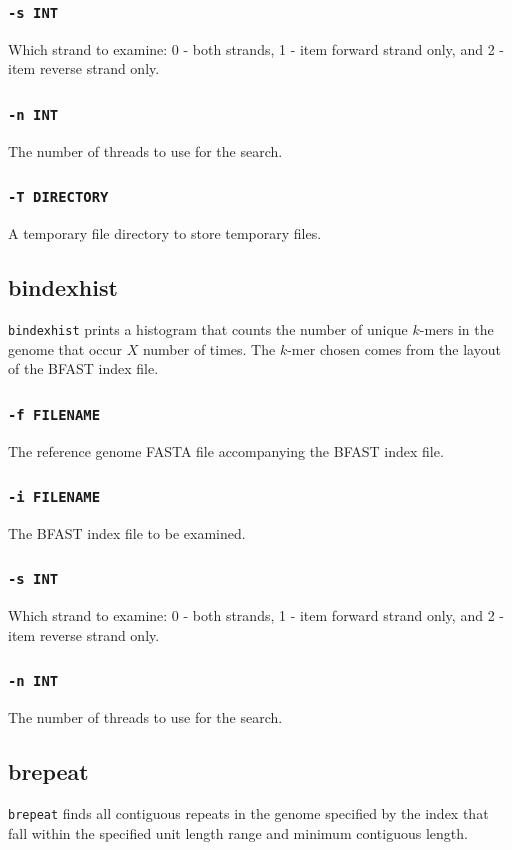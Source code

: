 \documentclass[a4paper,12pt]{book}
\newcommand{\TT}[1]{{\tt #1}} %
\newcommand{\rGFF}{reference genome FASTA file}
\newcommand{\BIF}{BFAST index file} %
\begin{document}
\subsubsection{\TT{-s INT}}
Which strand to examine: 0 - both strands, 1 - item forward strand only, and 2 - item reverse strand only.

\subsubsection{\TT{-n INT}}
The number of threads to use for the search.

\subsubsection{\TT{-T DIRECTORY}}
A temporary file directory to store temporary files.

\subsection{bindexhist}
\label{sec:bindexhist}
\TT{bindexhist} prints a histogram that counts the number of unique $k$-mers in the genome that occur $X$ number of
times.  
The $k$-mer chosen comes from the layout of the \BIF{}.

\subsubsection{\TT{-f FILENAME}}
The \rGFF{} accompanying the \BIF{}.

\subsubsection{\TT{-i FILENAME}}
The \BIF{} to be examined.

\subsubsection{\TT{-s INT}}
Which strand to examine: 0 - both strands, 1 - item forward strand only, and 2 - item reverse strand only.

\subsubsection{\TT{-n INT}}
The number of threads to use for the search.

\subsection{brepeat}
\label{sec:brepeat}
\TT{brepeat} finds all contiguous repeats in the genome specified by the index that fall within the specified unit length range and minimum contiguous length.
\end{document}
